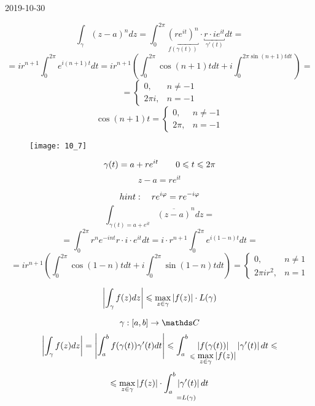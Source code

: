 \documentclass[main]{subfiles}
\begin{document}
\begin{lect}{2019-10-30}
    \begin{Example}[1]
        \[\int_\gamma (z - a)^n dz = \int_0^{2\pi} \underbracket{(re^{it} )^n
            }_{f(\gamma(t))} \cdot \underbracket{r \cdot ie^{it} }_{\gamma'(t)} dt = \]
        \[=ir^{n + 1} \int_0^{2\pi}e^{i(n + 1)t}dt = ir^{n + 1} (\int_0^{2\pi}
            \cos(n + 1)tdt + i\int_0^{2\pi \sin(n + 1)tdt} ) =   \]
        \[= \begin{cases}
                0,      & n \neq -1 \\
                2\pi i, & n = -1
            \end{cases}\]
        \[\cos(n + 1)t = \begin{cases}
                0,    & n \neq -1 \\
                2\pi, & n = -1
            \end{cases}\]
        \begin{figure}[H]
            \centering
            \texttt{[image: 10\_7]}
        \end{figure}
        \[\gamma(t) = a + re^{it} \qquad 0 \leqslant t \leqslant 2\pi \]
        \[z - a = re^{it} \]
    \end{Example}

    \begin{Example}[2]
        \[hint: \quad r e^{i\varphi} = r e^{-i \varphi}  \]
        \[\int_{\gamma(t) = a + e^{it} } \overline{(z - a)}^n dz =  \]
        \[=\int_0^{2\pi} r^n e^{-int} r \cdot i \cdot e^{it}dt =
            i \cdot r^{n + 1}  \int_0^{2\pi} e^{i(1 - n)t}dt =  \]
        \[=ir^{n + 1} \left(\int_0^{2\pi} \cos(1 - n)tdt + i\int_0^{2\pi}
            \sin(1 - n)tdt\right) = \begin{cases}
                0,          & n \neq 1 \\
                2\pi i r^2, & n = 1
            \end{cases}\]
    \end{Example}

    \begin{Utv}
        \[\left|\int_\gamma f(z)dz\right| \leqslant \max_{z \in \gamma} \left|f(z)\right| \cdot L(\gamma)\]
    \end{Utv}

    \begin{Proof}
        \[\gamma : [a, b] \to \CC\]
        \[\left|\int_\gamma f(z)dz\right| = \left|\int_a^b f(\gamma(t)) \gamma'(t)dt\right| \leqslant
            \int_a^b \underset{\leqslant \displaystyle \max_{z \in \gamma}
                \left|f(z)\right|}{\left|f(\gamma(t))\right| }\left|\gamma'(t)\right|dt \leqslant \]
        \[\leqslant \max_{z \in \gamma} \left|f(z)\right| \cdot \underset{= L(\gamma)}{\int_a^b \left|\gamma'(t)\right|dt }\]
    \end{Proof}


\end{lect}
\end{document}
